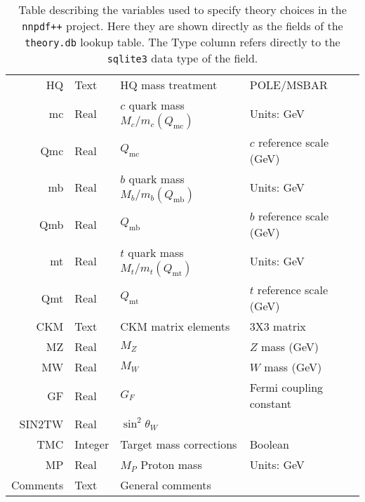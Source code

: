 \documentclass[11pt]{article}
\begin{document}
\begin{table}[htp]
\begin{center}
\begin{tabular}{|r|l|l|p{50mm}|}
  HQ        & Text    & HQ mass treatment              & POLE/MSBAR \\
  mc        & Real    & $c$ quark mass $M_c/m_c(Q_{\mathrm{mc}})$   & Units: GeV \\
  Qmc     & Real    & $Q_{\mathrm{mc}}$ & $c$ reference scale (GeV)\\
  mb        & Real    & $b$ quark mass $M_b/m_b(Q_{\mathrm{mb}})$   & Units: GeV \\
  Qmb     & Real    & $Q_{\mathrm{mb}}$ & $b$ reference scale (GeV)\\
  mt        & Real    & $t$ quark mass $M_t/m_t(Q_{\mathrm{mt}})$   & Units: GeV \\
  Qmt     & Real    & $Q_{\mathrm{mt}}$ & $t$ reference scale (GeV)\\
  CKM       & Text    & CKM matrix elements & 3X3 matrix \\ \pagebreak
  MZ        & Real    & $M_Z$                          & $Z$ mass (GeV) \\
  MW        & Real    & $M_W$                          & $W$ mass (GeV) \\
  GF        & Real    & $G_F$                          & Fermi coupling constant \\
  SIN2TW    & Real    & $\sin^2\theta_W$               & \\
  TMC       & Integer & Target mass corrections        & Boolean \\
  MP        & Real    & $M_P$ Proton mass              & Units: GeV \\
  Comments  & Text    & General comments               & \\               
\hline
\end{tabular}
\caption{Table describing the variables used to specify theory choices in the {\tt nnpdf++} project. Here they are shown directly as the fields of the {\tt theory.db} lookup table. The Type column refers directly to the {\tt sqlite3} data type of the field.}\label{tab:theoryparams}
\end{center}
\end{table}%


\clearpage
\end{document}
